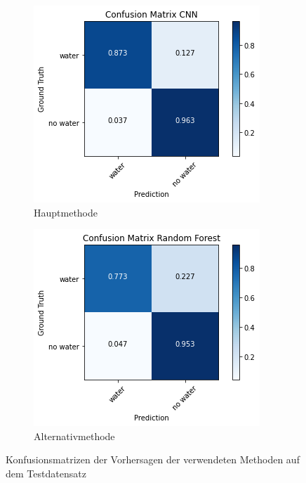 \begin{figure}
    \centering
    \begin{subfigure}{0.4\textwidth}
        \centering
        \includegraphics[width=\textwidth]{images/cm_cnn.png}
        \caption{Hauptmethode}
        \label{fig:cm_cnn}
    \end{subfigure}
    \begin{subfigure}{0.4\textwidth}
        \centering
        \includegraphics[width=\textwidth]{images/cm_rndf.png}
        \caption{Alternativmethode}
        \label{fig:cm_rndf}
    \end{subfigure}
    \caption{Konfusionsmatrizen der Vorhersagen der verwendeten Methoden auf dem Testdatensatz}
    \label{fig:confusionmatrix}
\end{figure}

